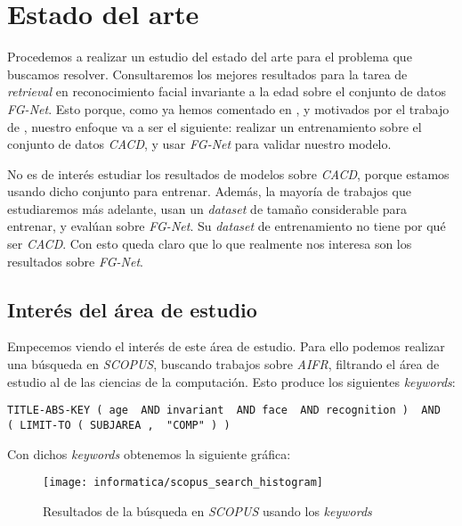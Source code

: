 \chapter{Estado del arte} \label{ich:estado_arte}

Procedemos a realizar un estudio del estado del arte para el problema que buscamos resolver. Consultaremos los mejores resultados para la tarea de \textit{retrieval } en reconocimiento facial invariante a la edad sobre el conjunto de datos \textit{FG-Net}. Esto porque, como ya hemos comentado en , y motivados por el trabajo de \cite{informatica:best_fgnet_model}, nuestro enfoque va a ser el siguiente: realizar un entrenamiento sobre el conjunto de datos \textit{CACD}, y usar \textit{FG-Net} para validar nuestro modelo.

No es de interés estudiar los resultados de modelos sobre \textit{CACD}, porque estamos usando dicho conjunto para entrenar. Además, la mayoría de trabajos que estudiaremos más adelante, usan un \textit{dataset} de tamaño considerable para entrenar, y evalúan sobre \textit{FG-Net}. Su \textit{dataset} de entrenamiento no tiene por qué ser \textit{CACD}. Con esto queda claro que lo que realmente nos interesa son los resultados sobre \textit{FG-Net}.

\section{Interés del área de estudio} \label{isec:interesareaestudio}

Empecemos viendo el interés de este área de estudio. Para ello podemos realizar una búsqueda en \textit{SCOPUS}, buscando trabajos sobre \textit{AIFR}, filtrando el área de estudio al de las ciencias de la computación. Esto produce los siguientes \textit{keywords}:

\begin{lstlisting}[caption=\textit{Keywords usados para la búsqueda en \textit{SCOPUS}. Búsqueda realizada el 17 de Septiembre de 2023}, label=code:scopus_search, captionpos=b]
    TITLE-ABS-KEY ( age  AND invariant  AND face  AND recognition )  AND  ( LIMIT-TO ( SUBJAREA ,  "COMP" ) )
\end{lstlisting}

Con dichos \textit{keywords} obtenemos la siguiente gráfica:

\begin{figure}[H]
    \centering
    \texttt{[image: informatica/scopus\_search\_histogram]}
    \caption{Resultados de la búsqueda en \textit{SCOPUS} usando los \textit{keywords} }
\end{figure}

